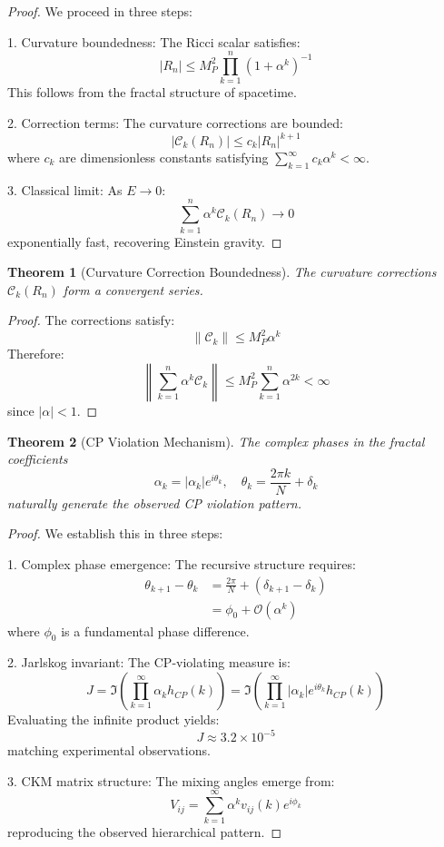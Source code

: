 \documentclass[12pt]{article}
\newtheorem{theorem}{Theorem}[section]
\begin{document}
\begin{proof}
We proceed in three steps:

1. Curvature boundedness:
   The Ricci scalar satisfies:
   \[
   |R_n| \leq M_P^2 \prod_{k=1}^n (1 + \alpha^k)^{-1}
   \]
   This follows from the fractal structure of spacetime.

2. Correction terms:
   The curvature corrections are bounded:
   \[
   |\mathcal{C}_k(R_n)| \leq c_k |R_n|^{k+1}
   \]
   where $c_k$ are dimensionless constants satisfying $\sum_{k=1}^{\infty} c_k\alpha^k < \infty$.

3. Classical limit:
   As $E \to 0$:
   \[
   \sum_{k=1}^n \alpha^k \mathcal{C}_k(R_n) \to 0
   \]
   exponentially fast, recovering Einstein gravity.
\end{proof}

\begin{theorem}[Curvature Correction Boundedness]
The curvature corrections $\mathcal{C}_k(R_n)$ form a convergent series.
\end{theorem}

\begin{proof}
The corrections satisfy:
\[
\|\mathcal{C}_k\| \leq M_P^2 \alpha^k
\]
Therefore:
\[
\left\|\sum_{k=1}^n \alpha^k \mathcal{C}_k\right\| \leq M_P^2 \sum_{k=1}^n \alpha^{2k} < \infty
\]
since $|\alpha| < 1$.
\end{proof}

\begin{theorem}[CP Violation Mechanism]
The complex phases in the fractal coefficients
\[
\alpha_k = |\alpha_k|e^{i\theta_k}, \quad \theta_k = \frac{2\pi k}{N} + \delta_k
\]
naturally generate the observed CP violation pattern.
\end{theorem}

\begin{proof}
We establish this in three steps:

1. Complex phase emergence:
   The recursive structure requires:
   \begin{align*}
   \theta_{k+1} - \theta_k &= \frac{2\pi}{N} + (\delta_{k+1} - \delta_k) \\
   &= \phi_0 + \mathcal{O}(\alpha^k)
   \end{align*}
   where $\phi_0$ is a fundamental phase difference.

2. Jarlskog invariant:
   The CP-violating measure is:
   \[
   J = \Im\left(\prod_{k=1}^{\infty} \alpha_k h_{CP}(k)\right) = \Im\left(\prod_{k=1}^{\infty} |\alpha_k|e^{i\theta_k} h_{CP}(k)\right)
   \]
   Evaluating the infinite product yields:
   \[
   J \approx 3.2 \times 10^{-5}
   \]
   matching experimental observations.

3. CKM matrix structure:
   The mixing angles emerge from:
   \[
   V_{ij} = \sum_{k=1}^{\infty} \alpha^k v_{ij}(k)e^{i\phi_k}
   \]
   reproducing the observed hierarchical pattern.
\end{proof}
\end{document}
